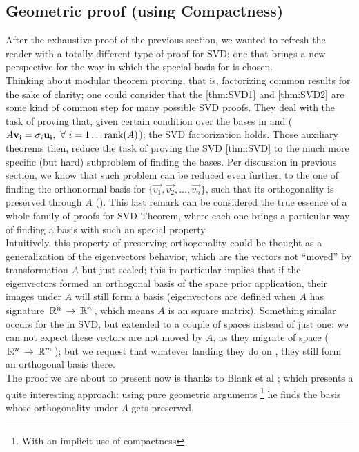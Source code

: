 \subsection{Geometric proof (using Compactness)}

After the exhaustive proof of the previous section, we wanted to
refresh the reader with a totally different type of proof for SVD; one
that brings a new perspective for the way in which the special basis
for  is chosen. \\

Thinking about modular theorem proving, that is, factorizing common
results for the sake of clarity; one could consider that the 
\cref{thm:SVD1} and \cref{thm:SVD2} are some kind  of common step
for many possible SVD proofs. They deal with the task of proving that,
given certain condition over the bases in  and  ($A\mathbf{v_i}
= \sigma_i\mathbf{u_i}, \,\,\forall\,\, i=1\dots\operatorname{rank}(A)$); the SVD
factorization holds. Those auxiliary 
theorems then, reduce the task of proving the SVD 
\cref{thm:SVD} to the much more specific (but hard) subproblem of
finding the bases. Per discussion in previous section, we know
that such problem can be reduced even further, to the one of finding
the orthonormal basis for  $\{\vec{v_1},\vec{v_2},\dots,\vec{v_n}\}$, such
that its orthogonality is preserved through $A$
(\cite{kalman96}). This last remark can be considered the true essence of a
whole family of proofs for SVD Theorem, where each one brings a
particular way of finding a basis with such an special
property. \\

Intuitively, this property of preserving orthogonality could be
thought as a generalization of the eigenvectors behavior, which
are the vectors not ``moved'' by transformation $A$ but just scaled; this in
particular implies that if the eigenvectors formed an orthogonal basis
of the space prior application, their images under $A$ will still form a
basis (eigenvectors are defined when $A$ has signature $\,\mathbb{R}^{n}\, \rightarrow
\,\mathbb{R}^{n}\,$, which means $A$ is an square matrix). Something similar occurs
for the  in SVD, but extended to a couple of spaces
instead of just one: we can not expect these vectors are not moved by
$A$, as they migrate of space ($\,\mathbb{R}^{n}\, \rightarrow \,\mathbb{R}^{m}\,$); but we request
that whatever landing they do on , they still form an orthogonal
basis there. \\ 

The proof we are about to present now is thanks to Blank et al
\cite{blank89}; which presents a quite interesting approach: using
pure geometric arguments \footnote{With an implicit use of
  compactness} he finds the basis whose orthogonality under $A$ gets
preserved. \\

